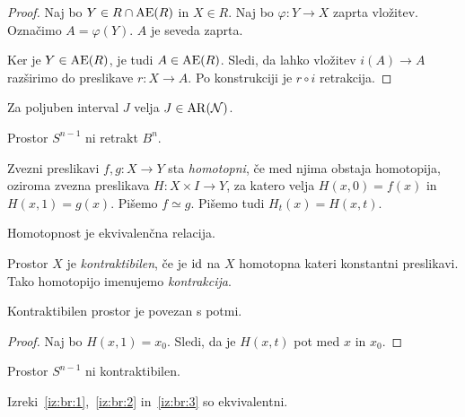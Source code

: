 \begin{proof}
Naj bo $Y \in R \cap \operatorname{AE}(R)$ in $X \in R$. Naj bo
$\varphi \colon Y \to X$ zaprta vložitev. Označimo
$A = \varphi(Y)$. $A$ je seveda zaprta.

Ker je $Y \in \operatorname{AE}(R)$, je tudi $A \in \operatorname{AE}(R)$. Sledi, da lahko
vložitev $i(A) \to A$ razširimo do preslikave $r \colon X \to A$.
Po konstrukciji je $r \circ i$ retrakcija.
\end{proof}

\begin{posledica}
Za poljuben interval $J$ velja $J \in \operatorname{AR}(\mathcal{N})$.
\end{posledica}

\begin{izrek}\label{iz:br:2}
Prostor $S^{n-1}$ ni retrakt $B^n$.
\end{izrek}

\begin{definicija}
Zvezni preslikavi $f, g \colon X \to Y$ sta
\emph{homotopni}, če med njima obstaja
homotopija, oziroma zvezna preslikava $H \colon X \times I \to Y$,
za katero velja $H(x, 0) = f(x)$ in $H(x, 1) = g(x)$. Pišemo
$f \simeq g$. Pišemo tudi $H_t(x) = H(x, t)$.
\end{definicija}

\begin{opomba}
Homotopnost je ekvivalenčna relacija.
\end{opomba}

\begin{definicija}
Prostor $X$ je
\emph{kontraktibilen}, če
je $\operatorname{id}$ na $X$ homotopna kateri konstantni preslikavi. Tako
homotopijo imenujemo \emph{kontrakcija}.
\end{definicija}

\begin{trditev}
Kontraktibilen prostor je povezan s potmi.
\end{trditev}

\begin{proof}
Naj bo $H(x, 1) = x_0$. Sledi, da je $H(x, t)$ pot med $x$ in
$x_0$.
\end{proof}

\begin{izrek}\label{iz:br:3}
Prostor $S^{n-1}$ ni kontraktibilen.
\end{izrek}

\begin{izrek}
Izreki~\ref{iz:br:1},~\ref{iz:br:2} in~\ref{iz:br:3} so
ekvivalentni.
\end{izrek}

